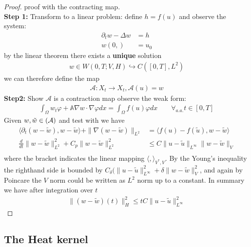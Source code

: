 \documentclass[a4paper,11pt,oneside,fleqn]{book}
\theoremstyle{definition}
\theoremstyle{remark}
\let\ran\relax
\let\ran\relax
\DeclareMathOperator{\ran}{ran}
\begin{document}
\begin{proof}
	proof with the contracting map. \\
	\textbf{Step 1:} Transform to a linear problem: define $h = f(u)$ and observe the system:
	\begin{align*}
		\partial_t w - \Delta w &= h\\
		w(0, ) &= u_0
	\end{align*}
	by the linear theorem there exists a \textbf{unique} solution 
	\begin{align*}
		w \in W(0, T; V, H) \hookrightarrow C([0, T], L^2)
	\end{align*}
	we can therefore define the map
	\begin{align*}
		\mathcal{A}: X_t \rightarrow X_t , \mathcal{A}(u) = w
	\end{align*}
	\textbf{Step2:} Show $\mathcal{A}$ is a contraction map
	observe the weak form:
	\begin{align*}
		\int_\Omega w_t \varphi + \mathbb{A} \nabla w \cdot \nabla \varphi dx = \int_\Omega f(u) \varphi dx \qquad \forall_{a.a.} t \in [0, T]
	\end{align*}
	Given $w, \tilde{w} \in \ran(\mathcal{A})$ and test with we have
	\begin{align*}
		\langle \partial_t(w - \tilde{w}), w - \tilde{w} \rangle 
		+ \|\nabla (w - \tilde{w})\|_{L^2} 
		&= \langle f(u) - f(\tilde{u}), w - \tilde{w} \rangle\\
		\frac{d}{dt}\|w - \tilde{w}\|_{L^2}^2 + C_p \|w - \tilde{w}\|_{L^2}^2 
		&\le C \|u - \tilde{u}\|_{L^\infty} \|w - \tilde{w}\|_V\\
	\end{align*}
	where the bracket indicates the linear mapping $\langle , \rangle_{V^*, V}$. By the Young's inequality the righthand side is bounded by 
	$C_\delta( \|u - \tilde{u}\|_{L^\infty}^2 + \delta \|w - \tilde{w}\|^2_{V}$, and again by Poincare the $V$ norm could be written as $L^2$ norm up to a constant. In summary we have after integration over $t$
	\begin{align*}
		\|(w - \tilde{w})(t)\|_H^2 \le t C \|u - \tilde{u}\|_{L^\infty}^2
	\end{align*}
\end{proof}





\subsection{The Heat kernel}
\end{document}
